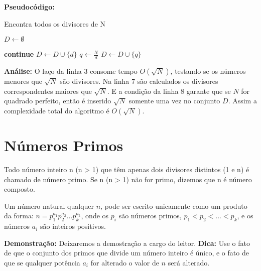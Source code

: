 \clearpage
\textbf{Pseudocódigo:}
\begin{algorithm}
\caption{Encontra todos os divisores de N}\label{encontra_divisores}
\begin{algorithmic}[1]
\State $D \gets \emptyset$ 


\State \textbf{continue}
\EndIf
\State $D \gets D \cup \{d\}$
\State $q \gets \frac{N}{d}$
\State $D \gets D \cup \{q\}$
\EndIf

\EndFor

\State {}
\EndProcedure
\end{algorithmic}
\end{algorithm}

\textbf{Análise:}
O laço da linha 3 consome tempo  $O(\sqrt{N})$, testando se os números menores que $\sqrt{N}$ são divisores. Na linha 7 são calculados os divisores correspondentes maiores 
que $\sqrt{N}$. E a condição da linha 8 garante que se $N$ for quadrado perfeito, então é inserido $\sqrt{N}$ somente uma vez no conjunto $D$.
Assim a complexidade total do algoritmo é $O(\sqrt{N})$.




\section{Números Primos}

\begin{definition} 
Todo número inteiro n (n > 1) que têm apenas dois divisores distintos (1 e n) é chamado de número primo. Se n (n > 1) não for primo, dizemos que n é número composto.
\end{definition}


\begin{theorem}\label{fatoracao_unica}
Um número natural qualquer $n$, pode ser escrito unicamente como um produto da forma: 
$n = p_1^{a_1}p_2^{a_2}...p_k^{a_k}$, onde os $p_i$ são números primos, $p_1 < p_2 < ... < p_k$, e os números $a_i$ são inteiros positivos.
\end{theorem}
\textbf{Demonstração:}
Deixaremos a demostração a cargo do leitor.
\textbf{Dica:} Use o fato de que o conjunto dos primos que divide um número inteiro é único, e o fato de que se qualquer potência $a_i$ for alterado o valor de $n$ será alterado.



